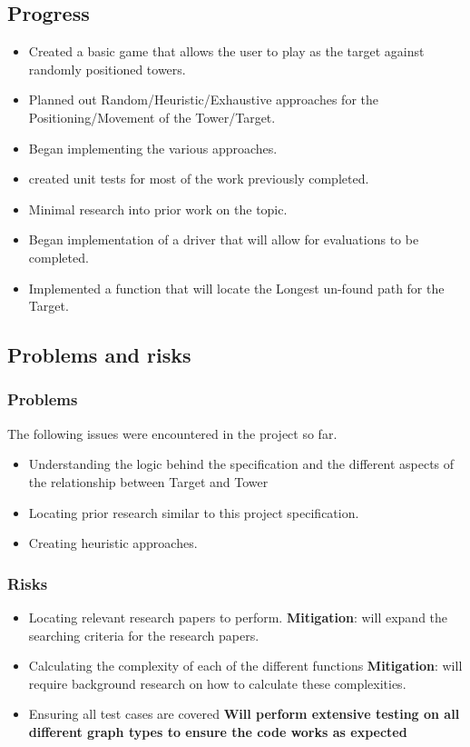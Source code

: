 \documentclass[11pt]{article}
\begin{document}
\subsection{Progress}\label{progress}
\begin{itemize}
\tightlist
\item Created a basic game that allows the user to play as the target against randomly positioned towers.
\item Planned out Random/Heuristic/Exhaustive approaches for the Positioning/Movement of the Tower/Target.
\item Began implementing the various approaches.
\item created unit tests for most of the work previously completed.
\item Minimal research into prior work on the topic.
\item Began implementation of a driver that will allow for evaluations to be completed.
\item Implemented a function that will locate the Longest un-found path for the Target.
\end{itemize}

\subsection{Problems and risks}\label{problems-and-risks}

\subsubsection{Problems}\label{problems}

The following issues were encountered in the project so far.
\begin{itemize}
    \tightlist
\item Understanding the logic behind the specification and the different aspects of the relationship between Target and Tower
\item Locating prior research similar to this project specification.
\item Creating heuristic approaches. 
\end{itemize}

\subsubsection{Risks}\label{risks}

\begin{itemize}
\tightlist
\item   Locating relevant research papers to perform. \textbf{Mitigation}: will expand the searching criteria for the research papers.
\item Calculating the complexity of each of the different functions \textbf{Mitigation}: will require background research on how to calculate these complexities.
\item Ensuring all test cases are covered \textbf{Will perform extensive testing on all different graph types to ensure the code works as expected}
\end{itemize}
\end{document}
